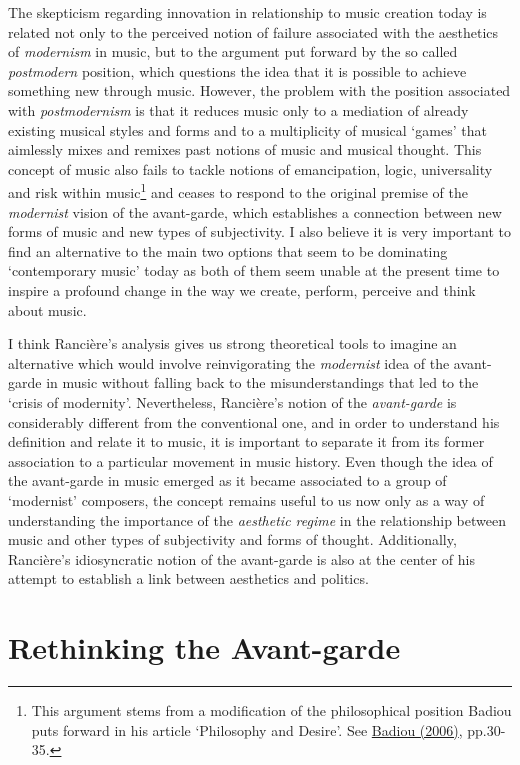 The skepticism regarding innovation in relationship to music creation today is related not only to the perceived notion of failure associated with the aesthetics of \emph{modernism} in music, but to the argument put forward by the so called \emph{postmodern} position, which questions the idea that it is possible to achieve something new through music. However, the problem with the position associated with \emph{postmodernism} is that it reduces music only to a mediation of already existing musical styles and forms and to a multiplicity of musical `games' that aimlessly mixes and remixes past notions of music and musical thought. This concept of music also fails to tackle notions of emancipation, logic, universality and risk within music\footnote{This argument stems from a modification of the philosophical position Badiou puts forward in his article `Philosophy and Desire'. See \hyperlink{infthought}{Badiou (2006)}, pp.30-35.} and ceases to respond to the original premise of the \emph{modernist} vision of the avant-garde, which establishes a connection between new forms of music and new types of subjectivity. I also believe it is very important to find an alternative to the main two options that seem to be dominating `contemporary music' today as both of them seem unable at the present time to inspire a profound change in the way we create, perform, perceive and think about music.

I think Ranci\`{e}re's analysis gives us strong theoretical tools to imagine an alternative which would involve reinvigorating the \emph{modernist} idea of the avant-garde in music without falling back to the misunderstandings that led to the `crisis of modernity'. Nevertheless, Ranci\`{e}re's notion of the \emph{avant-garde} is considerably different from the conventional one, and in order to understand his definition and relate it to music, it is important to separate it from its former association to a particular movement in music history. Even though the idea of the avant-garde in music emerged as it became associated to a group of `modernist' composers, the concept remains useful to us now only as a way of understanding the importance of the \emph{aesthetic regime} in the relationship between music and other types of subjectivity and forms of thought. Additionally, Ranci\`{e}re's idiosyncratic notion of the avant-garde is also at the center of his attempt to establish a link between aesthetics and politics. 

\section{Rethinking the Avant-garde}

